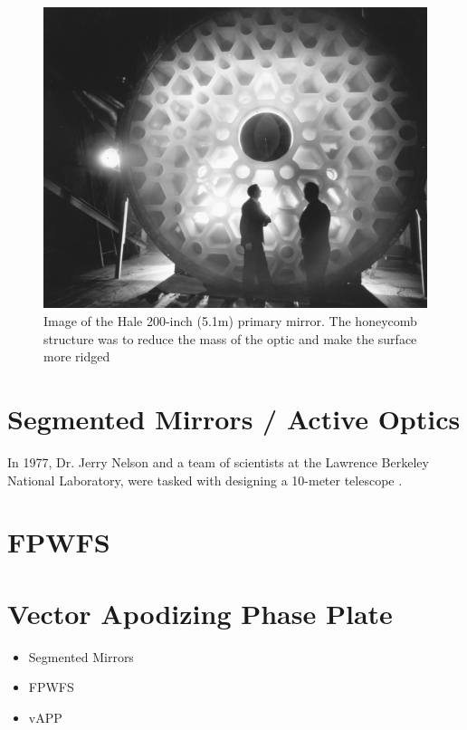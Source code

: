\begin{figure}[!h]
\centering
\includegraphics[width=12 cm]{../Figures/twomen}
\caption{Image of the Hale 200-inch (5.1m) primary mirror.  The honeycomb structure was to reduce the mass of the optic and make the surface more ridged}
\label{fig:hale}
\end{figure}


\section{Segmented Mirrors / Active Optics}
In 1977, Dr. Jerry Nelson and a team of scientists at the Lawrence Berkeley National Laboratory, were tasked with designing a 10-meter telescope \cite{BeatingObservatory}.  



\section{FPWFS}



\section{Vector Apodizing Phase Plate}






\begin{itemize}
    \item Segmented Mirrors
    \item FPWFS
    \item vAPP
\end{itemize}



